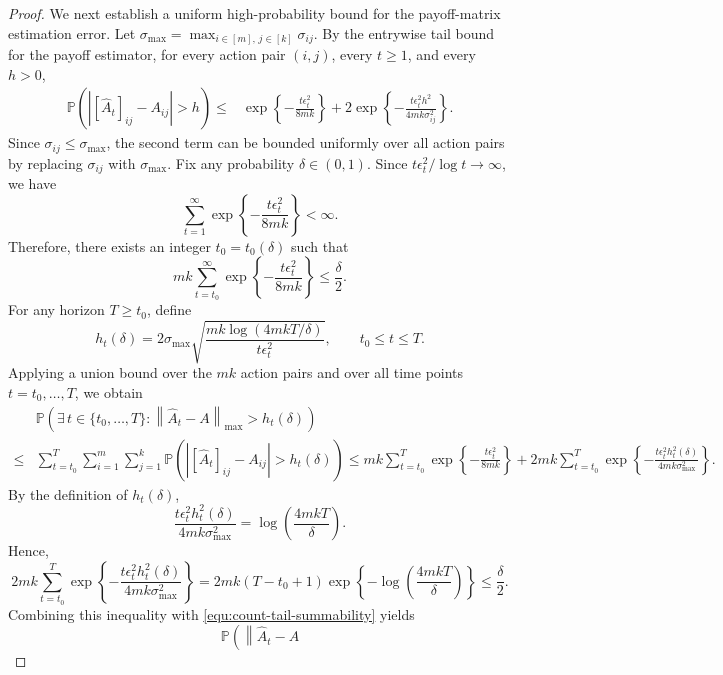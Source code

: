 \documentclass[12pt]{article}
\begin{document}
\begin{proof}
We next establish a uniform high-probability bound for the payoff-matrix
estimation error. Let
$\sigma_{\max}=\max_{i\in[m],\,j\in[k]}\sigma_{ij}$.
By the entrywise tail bound for the payoff estimator, for every action pair
$(i,j)$, every $t\ge1$, and every $h>0$,
\begin{align}
\label{equ:entrywise-payoff-tail}
\mathbb P\left(
\left|
[\widehat A_t]_{ij} - A_{ij}
\right|
> h
\right)
\le&
\exp\left\{
-
\frac{t\epsilon_t^2}{8mk}
\right\} +
2\exp\left\{
-
\frac{t\epsilon_t^2h^2}{4mk\sigma_{ij}^2}
\right\}.
\end{align}
Since $\sigma_{ij}\le\sigma_{\max}$, the second term can be bounded uniformly
over all action pairs by replacing $\sigma_{ij}$ with $\sigma_{\max}$.
Fix any probability $\delta\in(0,1)$. Since ${t\epsilon_t^2}/{\log t}\to\infty$,
we have
\[
\sum_{t=1}^{\infty}
\exp\left\{
-\frac{t\epsilon_t^2}{8mk}
\right\}
<
\infty.
\]
Therefore, there exists an integer $t_0=t_0(\delta)$ such that
\begin{equation}
\label{equ:count-tail-summability}
mk
\sum_{t=t_0}^{\infty}
\exp\left\{
-\frac{t\epsilon_t^2}{8mk}
\right\}
\le
\frac{\delta}{2}.
\end{equation}
For any horizon $T\ge t_0$, define
\[
h_t(\delta)
=
2\sigma_{\max}
\sqrt{\frac{mk\log\left(4mkT/\delta\right)}{t\epsilon_t^2}},
\qquad
t_0\le t\le T.
\]
Applying a union bound over the $mk$ action pairs and over all time points
$t=t_0,\ldots,T$, we obtain
\begin{align*}
&\mathbb P\left(
\exists\,
t\in\{t_0,\ldots,T\}
:
\left\|
\widehat A_t-A
\right\|_{\max}
>
h_t(\delta)
\right)
\\
\le&
\sum_{t=t_0}^T
\sum_{i=1}^m
\sum_{j=1}^k
\mathbb P\left(
\left|
[\widehat A_t]_{ij}-A_{ij}
\right|
> h_t(\delta)
\right)
\le
mk
\sum_{t=t_0}^T
\exp\left\{
-\frac{t\epsilon_t^2}{8mk}
\right\}
+ 2mk
\sum_{t=t_0}^T
\exp\left\{
-
\frac{t\epsilon_t^2h_t^2(\delta)}{4mk\sigma_{\max}^2}
\right\}.
\end{align*}
By the definition of $h_t(\delta)$,
\[
\frac{
t\epsilon_t^2h_t^2(\delta)
}{
4mk\sigma_{\max}^2
}
=
\log\left(
\frac{4mkT}{\delta}
\right).
\]
Hence,
\begin{equation*}
2mk \sum_{t=t_0}^T
\exp\left\{
-
\frac{t\epsilon_t^2h_t^2(\delta)}{4mk\sigma_{\max}^2}
\right\} =
2mk(T-t_0+1)
\exp\left\{
-
\log\left(
\frac{4mkT}{\delta}
\right)
\right\}
\le \frac{\delta}{2}.
\end{equation*}
Combining this inequality with
\eqref{equ:count-tail-summability} yields
\[
\mathbb P\left(
\left\|
\widehat A_t-A
\]
\end{proof}
\end{document}
